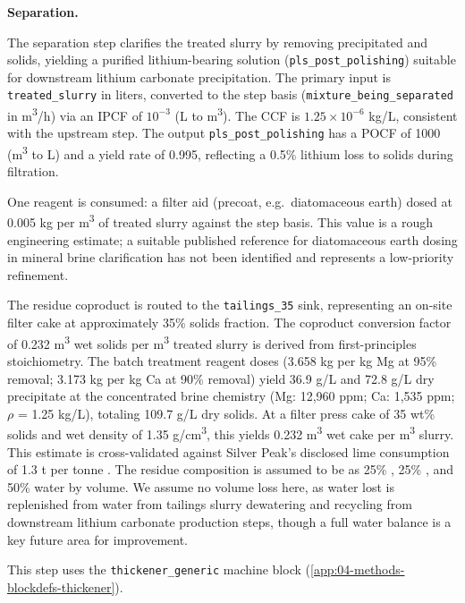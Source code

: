 \medskip
\noindent\textbf{Separation.}\quad

The separation step clarifies the treated slurry by removing precipitated  and  solids, yielding a purified lithium-bearing solution (\texttt{pls\_post\_polishing}) suitable for downstream lithium carbonate precipitation. The primary input is \texttt{treated\_slurry} in liters, converted to the step basis (\texttt{mixture\_being\_separated} in m\textsuperscript{3}/h) via an IPCF of $10^{-3}$ (L to m\textsuperscript{3}). The CCF is $1.25 \times 10^{-6}$ kg/L, consistent with the upstream step. The output \texttt{pls\_post\_polishing} has a POCF of 1000 (m\textsuperscript{3} to L) and a yield rate of 0.995, reflecting a 0.5\% lithium loss to solids during filtration.

One reagent is consumed: a filter aid (precoat, e.g.\ diatomaceous earth) dosed at 0.005 kg per m\textsuperscript{3} of treated slurry against the step basis. This value is a rough engineering estimate; a suitable published reference for diatomaceous earth dosing in mineral brine clarification has not been identified and represents a low-priority refinement.

The residue coproduct is routed to the \texttt{tailings\_35} sink, representing an on-site filter cake at approximately 35\% solids fraction. The coproduct conversion factor of 0.232 m\textsuperscript{3} wet solids per m\textsuperscript{3} treated slurry is derived from first-principles stoichiometry. The batch treatment reagent doses (3.658 kg  per kg Mg at 95\% removal; 3.173 kg  per kg Ca at 90\% removal) yield 36.9 g/L  and 72.8 g/L  dry precipitate at the concentrated brine chemistry (Mg: 12,960 ppm; Ca: 1,535 ppm; $\rho$ = 1.25 kg/L), totaling 109.7 g/L dry solids. At a filter press cake of 35 wt\% solids and wet density of 1.35 g/cm\textsuperscript{3}, this yields 0.232 m\textsuperscript{3} wet cake per m\textsuperscript{3} slurry. This estimate is cross-validated against Silver Peak's disclosed lime consumption of 1.3 t  per tonne . The residue composition is assumed to be as 25\% , 25\% , and 50\% water by volume. We assume no volume loss here, as water lost is replenished from water from tailings slurry dewatering and recycling from downstream lithium carbonate production steps, though a full water balance is a key future area for improvement. 

This step uses the \texttt{thickener\_generic} machine block (\ref{app:04-methods-blockdefs-thickener}).

